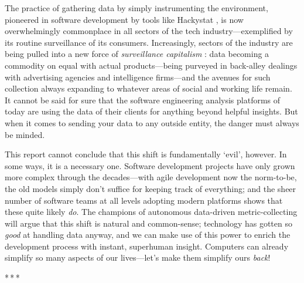 \documentclass[12pt]{article}
\newcommand{\parbreak}{\bigskip\par\centerline{*\,*\,*}\medskip\par}
\begin{document}
	The practice of gathering data by simply instrumenting the environment, pioneered in software development by tools like Hackystat \cite{telemetry}, is now overwhelmingly commonplace in all sectors of the tech industry---exemplified by its routine surveillance of its consumers. Increasingly, sectors of the industry are being pulled into a new force of \textit{surveillance capitalism} \cite{surveil}: data becoming a commodity on equal with actual products---being purveyed in back-alley dealings with advertising agencies and intelligence firms---and the avenues for such collection always expanding to whatever areas of social and working life remain. It cannot be said for sure that the software engineering analysis platforms of today are using the data of their clients for anything beyond helpful insights. But when it comes to sending your data to any outside entity, the danger must always be minded.
	
	This report cannot conclude that this shift is fundamentally `evil', however. In some ways, it is a necessary one. Software development projects have only grown more complex through the decades---with agile development now the norm-to-be, the old models simply don't suffice for keeping track of everything; and the sheer number of software teams at all levels adopting modern platforms shows that these quite likely \textit{do}. The champions of autonomous data-driven metric-collecting will argue that this shift is natural and common-sense; technology has gotten so \textit{good} at handling data anyway, and we can make use of this power to enrich the development process with instant, superhuman insight. Computers can already simplify so many aspects of our lives---let's make them simplify ours \textit{back}!
	
	\parbreak
	
\end{document}
